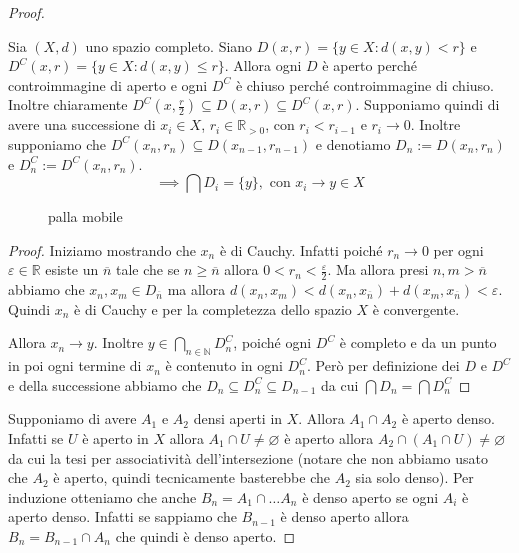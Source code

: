 \begin{proof}
    \begin{lemma}
    Sia \((X, d)\) uno spazio completo. 
    Siano \(D(x, r) = \{y \in X : d(x, y)< r\} \) e \(D^{C}(x, r) = \{y \in X :
    d(x, y) \le r\} \). Allora ogni \(D\) è aperto perché controimmagine di
    aperto e ogni \(D^{C}\) è chiuso perché controimmagine di chiuso.
    Inoltre chiaramente \(D^{C}(x, \frac{r}{2}) \subseteq D(x, r) \subseteq
    D^{C}(x, r) \). Supponiamo quindi di avere una successione di \(x_{i} \in
    X\), \(r_{i} \in \mathbb{R}_{> 0}\), con \(r_{i} < r_{i - 1}\) e \(r_{i}\to
    0\). Inoltre supponiamo che \(D^{C}(x_{n}, r_{n}) \subseteq D(x_{n-1},
    r_{n-1}) \) e denotiamo \(D_n := D(x_{n}, r_n)\) e \(D^{C}_n := D^{C}(x_n,
    r_n)\).
    \[
        \implies \bigcap D_i = \{y\}, \text{ con } x_i \to y \in X
    \]
\begin{figure}[ht]
    \centering
    \caption{palla mobile}
    \label{fig:palla-mobile}
\end{figure}
\end{lemma}
\begin{proof}
    Iniziamo mostrando che \(x_{n}\) è di Cauchy. Infatti poiché \(r_n \to 0 \)
    per ogni \(\varepsilon \in \mathbb{R}\) esiste un \(\overline{n}\) tale che
    se \(n \ge \overline{n}\) allora \(0 < r_n < \frac{\varepsilon}{2}\). Ma allora presi
    \(n, m > \overline{n}\) abbiamo che \(x_{n}, x_{m} \in D_{\overline{n}}\) ma
    allora \(d(x_{n}, x_{m}) < d(x_{n}, x_{\overline{n}}) + d(x_{m},
    x_{\overline{n}}) < \varepsilon\). Quindi \(x_{n}\) è di Cauchy e per la
    completezza dello spazio \(X\) è convergente.

    Allora \(x_{n} \to y\). Inoltre \(y \in \bigcap_{n \in \mathbb{N}}
    D^{C}_n\), poiché ogni \(D^{C}\) è completo e da un punto in poi ogni
    termine di \(x_{n}\) è contenuto in ogni \(D^{C}_n\).
    Però per definizione dei \(D\) e \(D^{C}\) e della successione abbiamo che
    \(D_n \subseteq D_n^{C} \subseteq D_{n-1}  \) da cui \(\bigcap D_n =
    \bigcap D_n^{C}  \) 
\end{proof}
Supponiamo di avere \(A_{1}\) e \(A_{2}\) densi aperti in \(X\). Allora \(A_{1}
\cap A_{2}\) è aperto denso. Infatti se \(U\) è aperto in \(X\) allora \(A_{1}
\cap U \neq \varnothing\) è aperto allora \(A_{2} \cap (A_{1} \cap U) \neq
\varnothing\) da cui la tesi per associatività dell'intersezione (notare che
non abbiamo usato che \(A_{2}\) è aperto, quindi tecnicamente basterebbe che
\(A_{2}\) sia solo denso). Per induzione otteniamo che anche \(B_n = A_{1} \cap
\dots A_n\) è denso aperto se ogni \(A_{i}\) è aperto denso. Infatti se sappiamo che
\(B_{n-1}\) è denso aperto allora \(B_n = B_{n-1} \cap A_n\) che quindi è denso
aperto.


\end{proof}
